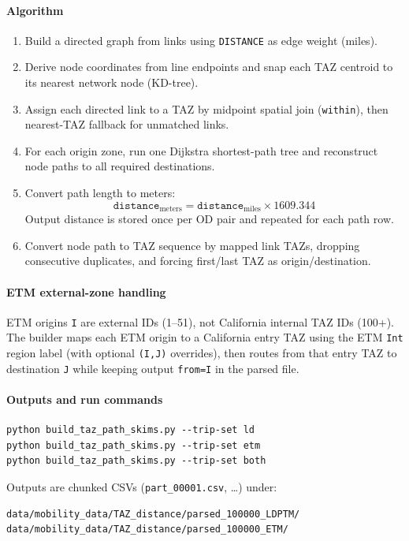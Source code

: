 \documentclass[11pt,a4paper]{article}
\begin{document}
\paragraph{Algorithm}
\begin{enumerate}[noitemsep]
  \item Build a directed graph from links using \texttt{DISTANCE} as edge weight (miles).
  \item Derive node coordinates from line endpoints and snap each TAZ centroid to its nearest network node (KD-tree).
  \item Assign each directed link to a TAZ by midpoint spatial join (\texttt{within}), then nearest-TAZ fallback for unmatched links.
  \item For each origin zone, run one Dijkstra shortest-path tree and reconstruct node paths to all required destinations.
  \item Convert path length to meters:
  \begin{equation}
    \texttt{distance}_{\text{meters}} = \texttt{distance}_{\text{miles}} \times 1609.344
  \end{equation}
  \noindent Output distance is stored once per OD pair and repeated for each path row.
  \item Convert node path to TAZ sequence by mapped link TAZs, dropping consecutive duplicates, and forcing first/last TAZ as origin/destination.
\end{enumerate}

\paragraph{ETM external-zone handling}
ETM origins \texttt{I} are external IDs (1--51), not California internal TAZ IDs (100+). The builder maps each ETM origin to a California entry TAZ using the ETM \texttt{Int} region label (with optional \texttt{(I,J)} overrides), then routes from that entry TAZ to destination \texttt{J} while keeping output \texttt{from=I} in the parsed file.

\paragraph{Outputs and run commands}
\begin{lstlisting}
python build_taz_path_skims.py --trip-set ld
python build_taz_path_skims.py --trip-set etm
python build_taz_path_skims.py --trip-set both
\end{lstlisting}
Outputs are chunked CSVs (\texttt{part\_00001.csv}, \ldots) under:
\begin{lstlisting}
data/mobility_data/TAZ_distance/parsed_100000_LDPTM/
data/mobility_data/TAZ_distance/parsed_100000_ETM/
\end{lstlisting}
\end{document}
